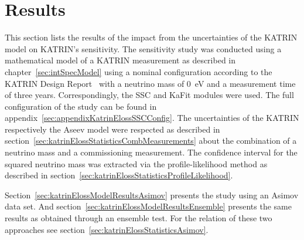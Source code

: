 \section{Results}
\label{sec:katrinElossModelResults}
This section lists the results of the impact from the uncertainties of the KATRIN model on KATRIN's sensitivity. The sensitivity study was conducted using a mathematical model of a KATRIN measurement as described in chapter~\ref{sec:intSpecModel} using a nominal configuration according to the KATRIN Design Report~\cite{Angrik:2005ep} with a neutrino mass of \SI{0}{eV} and a measurement time of three years. Correspondingly, the SSC and KaFit modules were used. The full configuration of the study can be found in appendix~\ref{sec:appendixKatrinElossSSCConfig}. The uncertainties of the KATRIN respectively the Aseev model were respected as described in section~\ref{sec:katrinElossStatisticsCombMeasurements} about the combination of a neutrino mass and a commissioning measurement. The confidence interval for the squared neutrino mass was extracted via the profile-likelihood method as described in section~\ref{sec:katrinElossStatisticsProfileLikelihood}.

Section~\ref{sec:katrinElossModelResultsAsimov} presents the study using an Asimov data set. And section~\ref{sec:katrinElossModelResultsEnsemble} presents the same results as obtained through an ensemble test. For the relation of these two approaches see section~\ref{sec:katrinElossStatisticsAsimov}.
